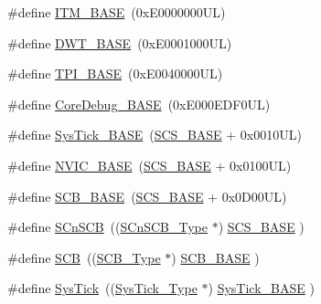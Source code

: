 \begin{DoxyCompactItemize}
\#define \mbox{\hyperlink{group___c_m_s_i_s__core__base_gadd76251e412a195ec0a8f47227a8359e}{I\+T\+M\+\_\+\+B\+A\+SE}}~(0x\+E0000000\+U\+L)
\item 
\#define \mbox{\hyperlink{group___c_m_s_i_s__core__base_gafdab534f961bf8935eb456cb7700dcd2}{D\+W\+T\+\_\+\+B\+A\+SE}}~(0x\+E0001000\+U\+L)
\item 
\#define \mbox{\hyperlink{group___c_m_s_i_s__core__base_ga2b1eeff850a7e418844ca847145a1a68}{T\+P\+I\+\_\+\+B\+A\+SE}}~(0x\+E0040000\+U\+L)
\item 
\#define \mbox{\hyperlink{group___c_m_s_i_s__core__base_ga680604dbcda9e9b31a1639fcffe5230b}{Core\+Debug\+\_\+\+B\+A\+SE}}~(0x\+E000\+E\+D\+F0\+U\+L)
\item 
\#define \mbox{\hyperlink{group___c_m_s_i_s__core__base_ga58effaac0b93006b756d33209e814646}{Sys\+Tick\+\_\+\+B\+A\+SE}}~(\mbox{\hyperlink{group___c_m_s_i_s__core__base_ga3c14ed93192c8d9143322bbf77ebf770}{S\+C\+S\+\_\+\+B\+A\+SE}} +  0x0010\+U\+L)
\item 
\#define \mbox{\hyperlink{group___c_m_s_i_s__core__base_gaa0288691785a5f868238e0468b39523d}{N\+V\+I\+C\+\_\+\+B\+A\+SE}}~(\mbox{\hyperlink{group___c_m_s_i_s__core__base_ga3c14ed93192c8d9143322bbf77ebf770}{S\+C\+S\+\_\+\+B\+A\+SE}} +  0x0100\+U\+L)
\item 
\#define \mbox{\hyperlink{group___c_m_s_i_s__core__base_gad55a7ddb8d4b2398b0c1cfec76c0d9fd}{S\+C\+B\+\_\+\+B\+A\+SE}}~(\mbox{\hyperlink{group___c_m_s_i_s__core__base_ga3c14ed93192c8d9143322bbf77ebf770}{S\+C\+S\+\_\+\+B\+A\+SE}} +  0x0\+D00\+U\+L)
\item 
\#define \mbox{\hyperlink{group___c_m_s_i_s__core__base_ga9fe0cd2eef83a8adad94490d9ecca63f}{S\+Cn\+S\+CB}}~((\mbox{\hyperlink{struct_s_cn_s_c_b___type}{S\+Cn\+S\+C\+B\+\_\+\+Type}}    $\ast$)     \mbox{\hyperlink{group___c_m_s_i_s__core__base_ga3c14ed93192c8d9143322bbf77ebf770}{S\+C\+S\+\_\+\+B\+A\+SE}}      )
\item 
\#define \mbox{\hyperlink{group___c_m_s_i_s__core__base_gaaaf6477c2bde2f00f99e3c2fd1060b01}{S\+CB}}~((\mbox{\hyperlink{struct_s_c_b___type}{S\+C\+B\+\_\+\+Type}}       $\ast$)     \mbox{\hyperlink{group___c_m_s_i_s__core__base_gad55a7ddb8d4b2398b0c1cfec76c0d9fd}{S\+C\+B\+\_\+\+B\+A\+SE}}      )
\item 
\#define \mbox{\hyperlink{group___c_m_s_i_s__core__base_gacd96c53beeaff8f603fcda425eb295de}{Sys\+Tick}}~((\mbox{\hyperlink{struct_sys_tick___type}{Sys\+Tick\+\_\+\+Type}}   $\ast$)     \mbox{\hyperlink{group___c_m_s_i_s__core__base_ga58effaac0b93006b756d33209e814646}{Sys\+Tick\+\_\+\+B\+A\+SE}}  )

\end{DoxyCompactItemize}
